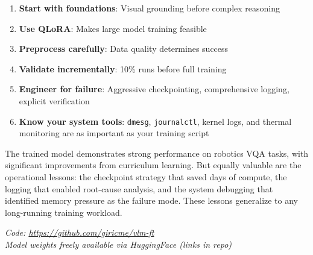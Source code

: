\documentclass[11pt,a4paper]{article}
\begin{document}
\begin{enumerate}
    \item \textbf{Start with foundations}: Visual grounding before complex reasoning
    \item \textbf{Use QLoRA}: Makes large model training feasible
    \item \textbf{Preprocess carefully}: Data quality determines success
    \item \textbf{Validate incrementally}: 10\% runs before full training
    \item \textbf{Engineer for failure}: Aggressive checkpointing, comprehensive logging, explicit verification
    \item \textbf{Know your system tools}: \texttt{dmesg}, \texttt{journalctl}, kernel logs, and thermal monitoring are as important as your training script
\end{enumerate}

The trained model demonstrates strong performance on robotics VQA tasks, with significant improvements from curriculum learning. But equally valuable are the operational lessons: the checkpoint strategy that saved days of compute, the logging that enabled root-cause analysis, and the system debugging that identified memory pressure as the failure mode. These lessons generalize to any long-running training workload.

\vspace{1cm}
\begin{center}
\textit{Code: \url{https://github.com/giricme/vlm-ft}} \\
\textit{Model weights freely available via HuggingFace (links in repo)}
\end{center}
\end{document}

